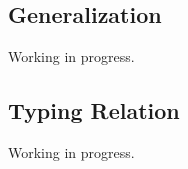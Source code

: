 \documentclass{report}
\newcommand{\code}{\mathtt}
\newcommand{\ruleTag}[1]{\label{#1}\tag{\textsc{#1}}}
\DeclareMathOperator{\freeVariable}{fv}
\begin{document}
\subsection{Generalization}

Working in progress.


\subsection{Typing Relation}

Working in progress.
\end{document}
